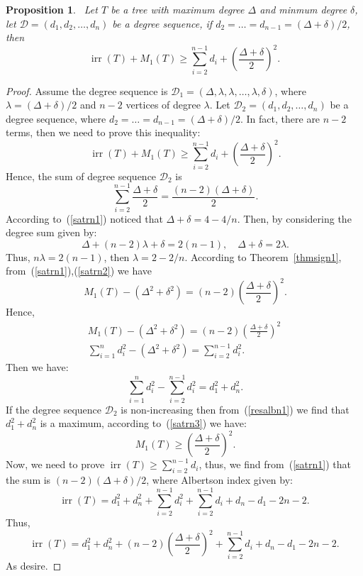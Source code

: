 \documentclass[12pt]{amsart}
\newcommand{\irr}{\operatorname{irr}}
\newtheorem{proposition}{Proposition}[section]
\begin{document}
\begin{proposition}~\label{prozagrebn1}
Let $T$ be a tree with maximum degree $\Delta$ and minmum degree $\delta$, let $\mathscr{D}=(d_1,d_2,\dots,d_n)$ be a degree sequence, if $d_2=\dots=d_{n-1}=(\Delta+\delta)/2$, then
\[
\irr(T)+ M_1(T) \geqslant \sum_{i=2}^{n-1} d_i+\left(\frac{\Delta + \delta}{2}\right)^2.
\]
\end{proposition}
\begin{proof}
Assume the degree sequence is $\mathscr{D}_1=(\Delta, \lambda, \lambda, \dots, \lambda, \delta)$, where $\lambda=(\Delta+\delta)/2$  and $n-2$ vertices of degree $\lambda$. Let $\mathscr{D}_2=(d_1,d_2,\dots,d_n)$ be a degree sequence, where $d_2=\dots=d_{n-1}=(\Delta+\delta)/2$. In fact, there are $n-2$ terms, then we need to prove this inequality:
\begin{equation}~\label{proveineq}
    \irr(T)+ M_1(T) \geqslant \sum_{i=2}^{n-1} d_i+\left(\frac{\Delta + \delta}{2}\right)^2.
\end{equation}
Hence, the sum of degree sequence $\mathscr{D}_2$ is 
\begin{equation}~\label{satrn1}
\sum_{i=2}^{n-1} \frac{\Delta + \delta}{2} = \frac{(n-2)(\Delta + \delta)}{2}.
\end{equation}
According to~(\ref{satrn1}) noticed that $\Delta + \delta = 4 - 4/n$. Then, by considering the degree sum given by:
\begin{equation}~\label{satrn2}
    \Delta + (n-2)\lambda + \delta = 2(n-1), \quad \Delta + \delta = 2\lambda.
\end{equation}
Thus, $n\lambda = 2(n-1)$, then $\lambda=2-2/n$. According to Theorem~\ref{thmsign1}, from~(\ref{satrn1}),(\ref{satrn2}) we have
\begin{equation}~\label{satrn3}
    M_1(T)-(\Delta^2+\delta^2) =(n-2)\left(\frac{\Delta + \delta}{2}\right)^2.
\end{equation}
Hence, 
\begin{gather*}
  M_1(T)-(\Delta^2+\delta^2)=(n-2)\left(\frac{\Delta + \delta}{2}\right)^2\\
  \sum_{i=1}^{n}d_i^2-(\Delta^2+\delta^2)  =\sum_{i=2}^{n-1}d_i^2.
\end{gather*}
Then we have: 
\begin{equation}~\label{resalbn1}
  \sum_{i=1}^{n}d_i^2- \sum_{i=2}^{n-1}d_i^2= d_1^2+d_n^2.
\end{equation}
If the degree sequence $\mathscr{D}_2$ is non-increasing then from~(\ref{resalbn1}) we find that $d_1^2+d_n^2$ is a maximum, according to~(\ref{satrn3}) we have: 
\begin{equation}~\label{resalbn2}
M_1(T) \geqslant \left(\frac{\Delta + \delta}{2}\right)^2.
\end{equation}
Now, we need to prove $\irr(T) \geq \sum_{i=2}^{n-1} d_i$, thus, we find from~(\ref{satrn1}) that the sum is $(n-2)(\Delta+\delta)/2$, where Albertson index given by: 
\[
 \irr(T)=d_1^2+d_n^2+\sum_{i=2}^{n-1} d_i^2+\sum_{i=2}^{n-1} d_i+d_n - d_1-2n-2.
\]
Thus, 
\[
 \irr(T)=d_1^2+d_n^2+(n-2)\left(\frac{\Delta + \delta}{2}\right)^2+\sum_{i=2}^{n-1} d_i+d_n - d_1-2n-2.
\]
As desire.
\end{proof}
\end{document}

